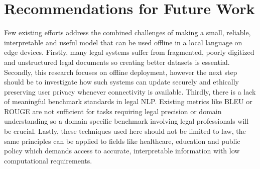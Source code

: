 \section{Recommendations for Future Work}
Few existing efforts address the combined challenges of making a small, reliable, interpretable and useful model that can be used offline in a local language on edge devices. Firstly, many legal systems suffer from fragmented, poorly digitized and unstructured legal documents so creating better datasets is essential. Secondly, this research focuses on offline deployment, however the next step should be to investigate how such systems can update securely and ethically preserving user privacy whenever connectivity is available. Thirdly, there is a lack of meaningful benchmark standards in legal NLP. Existing metrics like BLEU or ROUGE are not sufficient for tasks requiring legal precision or domain understanding so a domain specific benchmark involving legal professionals will be crucial. Lastly, these techniques used here should not be limited to law, the same principles can be applied to fields like healthcare, education and public policy which demands access to accurate, interpretable information with low computational requirements.